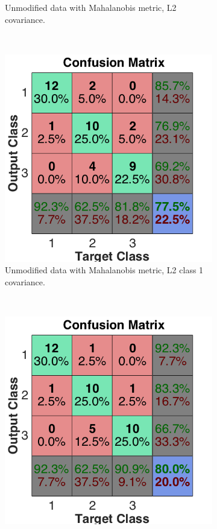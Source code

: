 \documentclass[a4paper, 10pt, conference]{ieeeconf}
\begin{document}
\begin{figure}[!ht]
\begin{subfigure}{0.32\textwidth}
      \caption{Unmodified data with Mahalanobis metric, L2 covariance.}
    \end{subfigure}
    \\
    \begin{subfigure}{0.32\textwidth}
      \includegraphics[width=\textwidth]{pic/unmod_cov_l2_class1.png}
      \caption{Unmodified data with Mahalanobis metric, L2 class 1 covariance.}
    \end{subfigure}
    ~
    \begin{subfigure}{0.32\textwidth}
      \includegraphics[width=\textwidth]{pic/unmod_cov_l2_class2.png}

\end{subfigure}
\end{figure}
\end{document}
